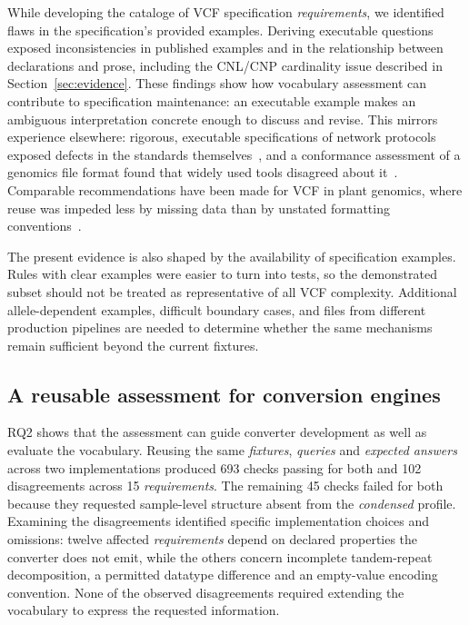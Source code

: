 While developing the cataloge of VCF specification \emph{requirements}, we identified flaws in the specification's provided examples.
Deriving executable questions exposed inconsistencies in published examples and in the relationship between declarations and prose, including the CNL/CNP cardinality issue described in Section~\ref{sec:evidence}.
These findings show how vocabulary assessment can contribute to specification maintenance: an executable example makes an ambiguous interpretation concrete enough to discuss and revise.
This mirrors experience elsewhere: rigorous, executable specifications of network protocols exposed defects in the standards themselves~\cite{bishop2005conformance}, and a conformance assessment of a genomics file format found that widely used tools disagreed about it~\cite{niu2022interop}.
Comparable recommendations have been made for VCF in plant genomics, where reuse was impeded less by missing data than by unstated formatting conventions~\cite{beier2022fairvcf}.

The present evidence is also shaped by the availability of specification examples.
Rules with clear examples were easier to turn into tests, so the demonstrated subset should not be treated as representative of all VCF complexity.
Additional allele-dependent examples, difficult boundary cases, and files from different production pipelines are needed to determine whether the same mechanisms remain sufficient beyond the current fixtures.

\subsection{A reusable assessment for conversion engines}

RQ2 shows that the assessment can guide converter development as well as evaluate the vocabulary.
Reusing the same \emph{fixtures}, \emph{queries} and \emph{expected answers} across two implementations produced 693 checks passing for both and 102 disagreements across 15 \emph{requirements}.
The remaining 45 checks failed for both because they requested sample-level structure absent from the \textit{condensed} profile.
Examining the disagreements identified specific implementation choices and omissions: twelve affected \emph{requirements} depend on declared properties the converter does not emit, while the others concern incomplete tandem-repeat decomposition, a permitted datatype difference and an empty-value encoding convention.
None of the observed disagreements required extending the vocabulary to express the requested information.

